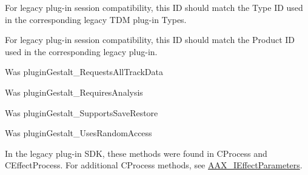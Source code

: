 \begin{DoxyRefList}
%
 For legacy plug-\/in session compatibility, this ID should match the Type ID used in the corresponding legacy T\+DM plug-\/in Types.  
\item[Member \mbox{\hyperlink{a00662_a13e384f22825afd3db6d68395b79ce0da3a41fcdff5af1a4fd19dcbca7b1ba6f3}{A\+A\+X\+\_\+e\+Property\+\_\+\+Product\+ID}} ]\label{a00787__porting_notes000042}%
%
 For legacy plug-\/in session compatibility, this ID should match the Product ID used in the corresponding legacy plug-\/in.  
\item[Member \mbox{\hyperlink{a00662_a13e384f22825afd3db6d68395b79ce0daa59caaf3d7c3e195a32b8cb09a9baac2}{A\+A\+X\+\_\+e\+Property\+\_\+\+Requests\+All\+Track\+Data}} ]\label{a00787__porting_notes000052}%
%
 Was plugin\+Gestalt\+\_\+\+Requests\+All\+Track\+Data  
\item[Member \mbox{\hyperlink{a00662_a13e384f22825afd3db6d68395b79ce0da925c49bb79454b33bf1d5f4cb09d373f}{A\+A\+X\+\_\+e\+Property\+\_\+\+Requires\+Analysis}} ]\label{a00787__porting_notes000048}%
%
 Was plugin\+Gestalt\+\_\+\+Requires\+Analysis  
\item[Member \mbox{\hyperlink{a00662_a13e384f22825afd3db6d68395b79ce0da6d42a3a901f36b74e7b9b8a84d4d5298}{A\+A\+X\+\_\+e\+Property\+\_\+\+Supports\+Save\+Restore}} ]\label{a00787__porting_notes000058}%
%
 Was plugin\+Gestalt\+\_\+\+Supports\+Save\+Restore  
\item[Member \mbox{\hyperlink{a00662_a13e384f22825afd3db6d68395b79ce0dab0bbaabe0a03b37e5a69f04a6f306076}{A\+A\+X\+\_\+e\+Property\+\_\+\+Uses\+Random\+Access}} ]\label{a00787__porting_notes000047}%
%
 Was plugin\+Gestalt\+\_\+\+Uses\+Random\+Access  
\item[Class \mbox{\hyperlink{a01665}{A\+A\+X\+\_\+\+I\+A\+C\+F\+Effect\+G\+UI}} ]\label{a00787__porting_notes000030}%
%
 In the legacy plug-\/in S\+DK, these methods were found in C\+Process and C\+Effect\+Process. For additional C\+Process methods, see \mbox{\hyperlink{a01825}{A\+A\+X\+\_\+\+I\+Effect\+Parameters}}. 
\item[Member \mbox{\hyperlink{a01665_a3922a4b9fef09e88440d7655422c2b96}{A\+A\+X\+\_\+\+I\+A\+C\+F\+Effect\+G\+UI::Set\+Control\+Highlight\+Info}} (A\+A\+X\+\_\+\+C\+Param\+ID i\+Parameter\+ID, A\+A\+X\+\_\+\+C\+Boolean i\+Is\+Highlighted, A\+A\+X\+\_\+\+E\+Highlight\+Color i\+Color)=0]\label{a00787__porting_notes000031}%

\end{DoxyRefList}
